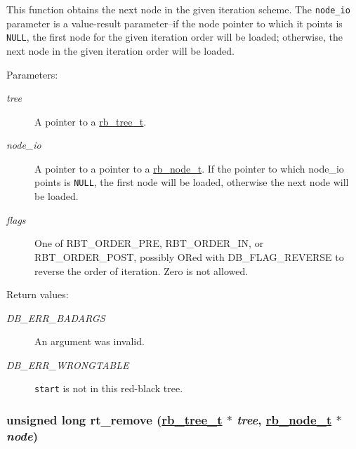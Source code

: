 This function obtains the next node in the given iteration scheme. The {\tt node\_\-io} parameter is a value-result parameter--if the node pointer to which it points is {\tt NULL}, the first node for the given iteration order will be loaded; otherwise, the next node in the given iteration order will be loaded.\begin{Desc}
\item[Parameters: ]\par
\begin{description}
\item[{\em 
tree}]A pointer to a \hyperlink{group__dbprim__rbtree_a0}{rb\_\-tree\_\-t}. \item[{\em 
node\_\-io}]A pointer to a pointer to a \hyperlink{group__dbprim__rbtree_a1}{rb\_\-node\_\-t}. If the pointer to which node\_\-io points is {\tt NULL}, the first node will be loaded, otherwise the next node will be loaded. \item[{\em 
flags}]One of RBT\_\-ORDER\_\-PRE, RBT\_\-ORDER\_\-IN, or RBT\_\-ORDER\_\-POST, possibly ORed with DB\_\-FLAG\_\-REVERSE to reverse the order of iteration. Zero is not allowed.\end{description}
\end{Desc}
\begin{Desc}
\item[Return values: ]\par
\begin{description}
\item[{\em 
DB\_\-ERR\_\-BADARGS}]An argument was invalid. \item[{\em 
DB\_\-ERR\_\-WRONGTABLE}]{\tt start} is not in this red-black tree. \end{description}
\end{Desc}
\hypertarget{group__dbprim__rbtree_a8}{
\subsubsection[rt\_\-remove]{\setlength{\rightskip}{0pt plus 5cm}unsigned long rt\_\-remove (\hyperlink{group__dbprim__rbtree_a0}{rb\_\-tree\_\-t} $\ast$ {\em tree}, \hyperlink{group__dbprim__rbtree_a1}{rb\_\-node\_\-t} $\ast$ {\em node})}}
\label{group__dbprim__rbtree_a8}


